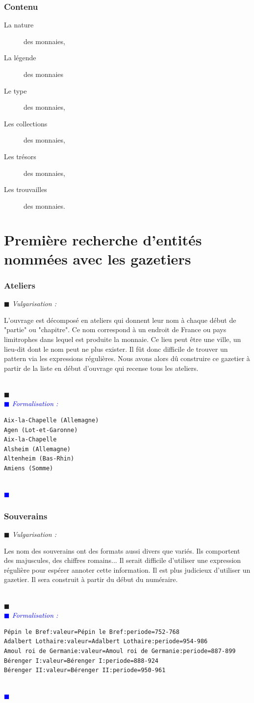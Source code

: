 \documentclass[a4paper, 11pt]{report}
\newenvironment{vulgarisation}
    {
    \textit{\textcolor{dark-blue}{$\blacksquare$  Vulgarisation : \\}}

    }
    {
    ~\\\textcolor{dark-blue}{$\blacksquare$}\\
    }
\newenvironment{formalisation}
    {
    \textit{\textcolor{blue}{$\blacksquare$  Formalisation : \\}}
    }
    {
    ~\\\textcolor{blue}{$\blacksquare$}\\
    }
\begin{document}
    \subsubsection{Contenu} 
    \begin{description}
    \item[La nature] des monnaies,
    \item[La légende] des monnaies
    \item[Le type] des monnaies,
    \item[Les collections] des monnaies,
    \item[Les trésors] des monnaies,
    \item[Les trouvailles] des monnaies.
    \end{description}
    
    
    \section{Première recherche d'entités nommées avec les gazetiers}
    \subsubsection{Ateliers}
\begin{vulgarisation}
    L'ouvrage est décomposé en ateliers qui donnent leur nom à chaque début de "partie" ou "chapitre". Ce nom correspond à un endroit de France ou pays limitrophes dans lequel est produite la monnaie. Ce lieu peut être une ville, un lieu-dit dont le nom peut ne plus exister. Il fût donc difficile de trouver un pattern via les expressions régulières. Nous avons alors dû construire ce gazetier à partir de la liste en début d'ouvrage qui recense tous les ateliers.
\end{vulgarisation}
\begin{formalisation}
\begin{verbatim}
Aix-la-Chapelle (Allemagne)
Agen (Lot-et-Garonne)
Aix-la-Chapelle
Alsheim (Allemagne)
Altenheim (Bas-Rhin)
Amiens (Somme)
\end{verbatim}
\end{formalisation}

\subsubsection{Souverains}
\begin{vulgarisation}
    Les nom des souverains ont des formats aussi divers que variés. Ils comportent des majuscules, des chiffres romains... Il serait difficile d'utiliser une expression régulière pour espérer annoter cette information. Il est plus judicieux d'utiliser un gazetier. Il sera construit à partir du début du numéraire. 
\end{vulgarisation}
\begin{formalisation}
\begin{verbatim}
Pépin le Bref:valeur=Pépin le Bref:periode=752-768
Adalbert Lothaire:valeur=Adalbert Lothaire:periode=954-986
Amoul roi de Germanie:valeur=Amoul roi de Germanie:periode=887-899
Bérenger I:valeur=Bérenger I:periode=888-924
Bérenger II:valeur=Bérenger II:periode=950-961
\end{verbatim}
\end{formalisation}
\end{document}
